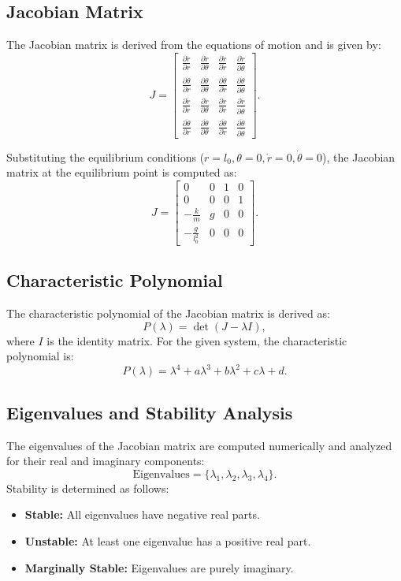 \documentclass[12pt]{article}
\begin{document}
\subsection{Jacobian Matrix}
The Jacobian matrix is derived from the equations of motion and is given by:
\[
J = 
\begin{bmatrix}
\frac{\partial \dot{r}}{\partial r} & \frac{\partial \dot{r}}{\partial \theta} & \frac{\partial \dot{r}}{\partial \dot{r}} & \frac{\partial \dot{r}}{\partial \dot{\theta}} \\
\frac{\partial \dot{\theta}}{\partial r} & \frac{\partial \dot{\theta}}{\partial \theta} & \frac{\partial \dot{\theta}}{\partial \dot{r}} & \frac{\partial \dot{\theta}}{\partial \dot{\theta}} \\
\frac{\partial \ddot{r}}{\partial r} & \frac{\partial \ddot{r}}{\partial \theta} & \frac{\partial \ddot{r}}{\partial \dot{r}} & \frac{\partial \ddot{r}}{\partial \dot{\theta}} \\
\frac{\partial \ddot{\theta}}{\partial r} & \frac{\partial \ddot{\theta}}{\partial \theta} & \frac{\partial \ddot{\theta}}{\partial \dot{r}} & \frac{\partial \ddot{\theta}}{\partial \dot{\theta}}
\end{bmatrix}.
\]

Substituting the equilibrium conditions (\( r = l_0, \theta = 0, \dot{r} = 0, \dot{\theta} = 0 \)), the Jacobian matrix at the equilibrium point is computed as:
\[
J =
\begin{bmatrix}
0 & 0 & 1 & 0 \\
0 & 0 & 0 & 1 \\
-\frac{k}{m} & g & 0 & 0 \\
-\frac{g}{l_0^2} & 0 & 0 & 0
\end{bmatrix}.
\]

\subsection{Characteristic Polynomial}
The characteristic polynomial of the Jacobian matrix is derived as:
\[
P(\lambda) = \det(J - \lambda I),
\]
where \( I \) is the identity matrix. For the given system, the characteristic polynomial is:
\[
P(\lambda) = \lambda^4 + a \lambda^3 + b \lambda^2 + c \lambda + d.
\]

\subsection{Eigenvalues and Stability Analysis}
The eigenvalues of the Jacobian matrix are computed numerically and analyzed for their real and imaginary components:
\[
\text{Eigenvalues} = \{ \lambda_1, \lambda_2, \lambda_3, \lambda_4 \}.
\]
Stability is determined as follows:
\begin{itemize}
    \item \textbf{Stable:} All eigenvalues have negative real parts.
    \item \textbf{Unstable:} At least one eigenvalue has a positive real part.
    \item \textbf{Marginally Stable:} Eigenvalues are purely imaginary.
\end{itemize}
\end{document}
